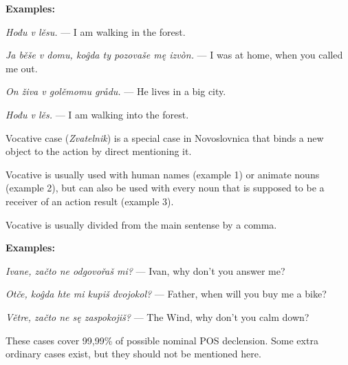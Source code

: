\textbf{Examples:}

\textit{Hođu v lěsu.} — I am walking in the forest.

\textit{Ja běše v domu, koĝda ty pozovaše mę izvòn.} — I was at home, when you called me out.

\textit{On živa v golěmomu grådu.} — He lives in a big city.

\textit{Hođu v lěs.} — I am walking into the forest.

Vocative case (\textit{Zvatelnik}) is a special case in Novoslovnica that binds a new object to the action by direct mentioning it.

Vocative is usually used with human names (example 1) or animate nouns (example 2), but can also be used with every noun that is supposed to be a receiver of an action result (example 3).

Vocative is usually divided from the main sentense by a comma.

\textbf{Examples:}

\textit{Ivane, začto ne odgovořaš mi?} — Ivan, why don't you answer me?

\textit{Otče, koĝda hte mi kupiš dvojokol?} — Father, when will you buy me a bike?

\textit{Větre, začto ne sę zaspokojiš?} — The Wind, why don't you calm down?

These cases cover 99,99\% of possible nominal POS declension. Some extra ordinary cases exist, but they should not be mentioned here.
